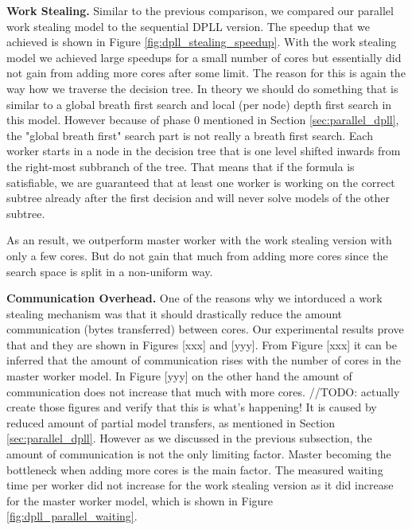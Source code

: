\documentclass[letterpaper]{article}
\newcommand{\mypar}[1]{{\bf #1.}}
\begin{document}
\mypar{Work Stealing}
Similar to the previous comparison, we compared our parallel work stealing model to the sequential DPLL version.
The speedup that we achieved is shown in Figure \ref{fig:dpll_stealing_speedup}.
With the work stealing model we achieved large speedups for a small number of cores but essentially did not gain from adding more cores after some limit.
The reason for this is again the way how we traverse the decision tree.
In theory we should do something that is similar to a global breath first search and local (per node) depth first search in this model.
However because of phase 0 mentioned in Section \ref{sec:parallel_dpll}, the "global breath first" search part is not really a breath first search.
Each worker starts in a node in the decision tree that is one level shifted inwards from the right-most subbranch of the tree.
That means that if the formula is satisfiable, we are guaranteed that at least one worker is working on the correct subtree already after the first decision and will never solve models of the other subtree.

As an result, we outperform master worker with the work stealing version with only a few cores.
But do not gain that much from adding more cores since the search space is split in a non-uniform way.

\mypar{Communication Overhead}
One of the reasons why we intorduced a work stealing mechanism was that it should drastically reduce the amount communication (bytes transferred) between cores.
Our experimental results prove that and they are shown in Figures [xxx] and [yyy].
From Figure [xxx] it can be inferred that the amount of communication rises with the number of cores in the master worker model.
In Figure [yyy] on the other hand the amount of communication does not increase that much with more cores.
//TODO: actually create those figures and verify that this is what's happening!
It is caused by reduced amount of partial model transfers, as mentioned in Section \ref{sec:parallel_dpll}.
However as we discussed in the previous subsection, the amount of communication is not the only limiting factor.
Master becoming the bottleneck when adding more cores is the main factor.
The measured waiting time per worker did not increase for the work stealing version as it did increase for the master worker model, which is shown in Figure \ref{fig:dpll_parallel_waiting}.
\end{document}
